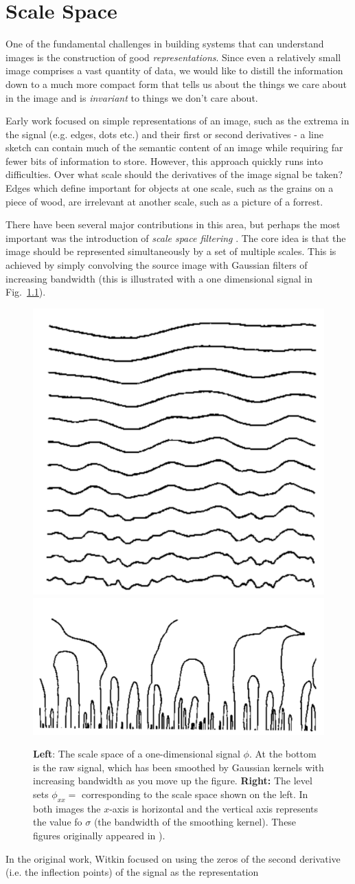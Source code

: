 \chapter{Scale Space} \label{chap:scale-space}

One of the fundamental challenges in building systems that can understand images is the construction of good \textit{representations}.  Since even a relatively small image comprises a vast quantity of data, we would like to distill the information down to a much more compact form that tells us about the things we care about in the image and is \textit{invariant} to things we don't care about.  

Early work focused on simple representations of an image, such as the extrema in the signal (e.g. edges, dots etc.) and their first or second derivatives - a line sketch can contain much of the semantic content of an image while requiring far fewer bits of information to store.  However, this approach quickly runs into difficulties.  Over what scale should the derivatives of the image signal be taken?  Edges which define important for objects at one scale, such as the grains on a piece of wood, are irrelevant at another scale, such as a picture of a forrest. 

There have been several major contributions in this area, but perhaps the most important was the introduction of \textit{scale space filtering} \cite{witkin1987scale}.  The core idea is that the image should be represented simultaneously by a set of multiple scales.  This is achieved by simply convolving the source image with Gaussian filters of increasing bandwidth (this is illustrated with a one dimensional signal in Fig.~\ref{fig:scales}).  

\begin{figure}
\centering
\includegraphics[height=0.3\textwidth]{figs/scale-space.png}
\includegraphics[height=0.25\textwidth]{figs/zero-crossings.png}
\caption{\textbf{Left}: The scale space of a one-dimensional signal $\phi$.  At the bottom is the raw signal, which has been smoothed by Gaussian kernels with increasing bandwidth as you move up the figure. \textbf{Right:} The level sets $ \phi_{xx} = $ corresponding to the scale space shown on the left.  In both images the $x$-axis is horizontal and the vertical axis represents the value fo $\sigma$ (the bandwidth of the smoothing kernel). These figures originally appeared in \cite{witkin1987scale}).\label{fig:scales}}
\end{figure}

In the original work, Witkin focused on using the zeros of the second derivative (i.e. the inflection points) of the signal as the representation
